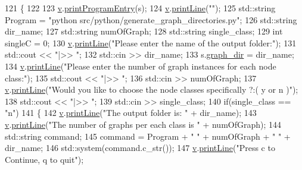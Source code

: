 \begin{DoxyCode}
121 \{
122     
123     \hyperlink{class_application_a96cff2295a95d7e6de06638bb7e61243}{v}.\hyperlink{class_visualize_a29f27ff8c5e59163eea2be42ff372405}{printProgramEntry}(s);
124     \hyperlink{class_application_a96cff2295a95d7e6de06638bb7e61243}{v}.\hyperlink{class_visualize_abce6cd538dc0715b21851e0bf0377d85}{printLine}(\textcolor{stringliteral}{""});
125     std::string Program = \textcolor{stringliteral}{"python src/python/generate\_graph\_directories.py"};
126     std::string dir\_name;
127     std::string numOfGraph;
128     std::string single\_class;
129     \textcolor{keywordtype}{int} singleC = 0;
130     \hyperlink{class_application_a96cff2295a95d7e6de06638bb7e61243}{v}.\hyperlink{class_visualize_abce6cd538dc0715b21851e0bf0377d85}{printLine}(\textcolor{stringliteral}{"Please enter the name of the output folder:"});
131     std::cout << \textcolor{stringliteral}{"|>> "};
132     std::cin >> dir\_name;
133     s.\hyperlink{struct_session_aecaa42a56f197e0874041533ccb358a6}{graph\_dir} = dir\_name;
134     \hyperlink{class_application_a96cff2295a95d7e6de06638bb7e61243}{v}.\hyperlink{class_visualize_abce6cd538dc0715b21851e0bf0377d85}{printLine}(\textcolor{stringliteral}{"Please enter the number of graph instances for each node class:"});
135     std::cout << \textcolor{stringliteral}{"|>> "};
136     std::cin >> numOfGraph;
137     \hyperlink{class_application_a96cff2295a95d7e6de06638bb7e61243}{v}.\hyperlink{class_visualize_abce6cd538dc0715b21851e0bf0377d85}{printLine}(\textcolor{stringliteral}{"Would you like to choose the node classes specifically ?:( y or n )"});
138     std::cout << \textcolor{stringliteral}{"|>> "};
139     std::cin >> single\_class;
140     \textcolor{keywordflow}{if}(single\_class == \textcolor{stringliteral}{"n"})
141     \{   
142         \hyperlink{class_application_a96cff2295a95d7e6de06638bb7e61243}{v}.\hyperlink{class_visualize_abce6cd538dc0715b21851e0bf0377d85}{printLine}(\textcolor{stringliteral}{"The output folder is: "} + dir\_name);
143         \hyperlink{class_application_a96cff2295a95d7e6de06638bb7e61243}{v}.\hyperlink{class_visualize_abce6cd538dc0715b21851e0bf0377d85}{printLine}(\textcolor{stringliteral}{"The number of graphs per each class is "} + numOfGraph);
144         std::string command;
145         command = Program + \textcolor{stringliteral}{" "} + numOfGraph + \textcolor{stringliteral}{" "} + dir\_name;
146         std::system(command.c\_str());
147          \hyperlink{class_application_a96cff2295a95d7e6de06638bb7e61243}{v}.\hyperlink{class_visualize_abce6cd538dc0715b21851e0bf0377d85}{printLine}(\textcolor{stringliteral}{"Press c to Continue, q to quit"});

\end{DoxyCode}
